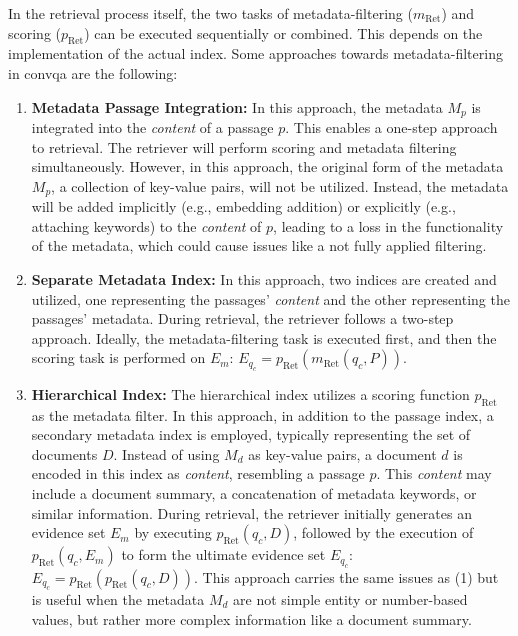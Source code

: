 In the retrieval process itself, the two tasks of metadata-filtering ($m_{\text{Ret}}$) and scoring ($p_{\text{Ret}}$) can be executed sequentially or combined. This depends on the implementation of the actual index. Some approaches towards metadata-filtering in \gls{convqa} are the following:

\begin{enumerate}
    \item \textbf{Metadata Passage Integration:} In this approach, the metadata $M_p$ is integrated into the \textit{content} of a passage $p$. This enables a one-step approach to retrieval. The retriever will perform scoring and metadata filtering simultaneously. However, in this approach, the original form of the metadata $M_p$, a collection of key-value pairs, will not be utilized. Instead, the metadata will be added implicitly (e.g., embedding addition) or explicitly (e.g., attaching keywords) to the \textit{content} of $p$, leading to a loss in the functionality of the metadata, which could cause issues like a not fully applied filtering.
    \item \textbf{Separate Metadata Index:} In this approach, two indices are created and utilized, one representing the passages' \textit{content} and the other representing the passages' metadata. During retrieval, the retriever follows a two-step approach. Ideally, the metadata-filtering task is executed first, and then the scoring task is performed on $E_m$: $E_{q_c} = p_{\text{Ret}}(m_{\text{Ret}}(q_c,P))$.
    \item \textbf{Hierarchical Index:} The hierarchical index utilizes a scoring function $p_{\text{Ret}}$ as the metadata filter. In this approach, in addition to the passage index, a secondary metadata index is employed, typically representing the set of documents $D$. Instead of using $M_d$ as key-value pairs, a document $d$ is encoded in this index as \textit{content}, resembling a passage $p$. This \textit{content} may include a document summary, a concatenation of metadata keywords, or similar information. During retrieval, the retriever initially generates an evidence set $E_m$ by executing $p_{\text{Ret}}(q_c, D)$, followed by the execution of $p_{\text{Ret}}(q_c, E_m)$ to form the ultimate evidence set $E_{q_c}$: $E_{q_c} = p_{\text{Ret}}(p_{\text{Ret}}(q_c, D))$. This approach carries the same issues as (1) but is useful when the metadata $M_d$ are not simple entity or number-based values, but rather more complex information like a document summary.
\end{enumerate}

